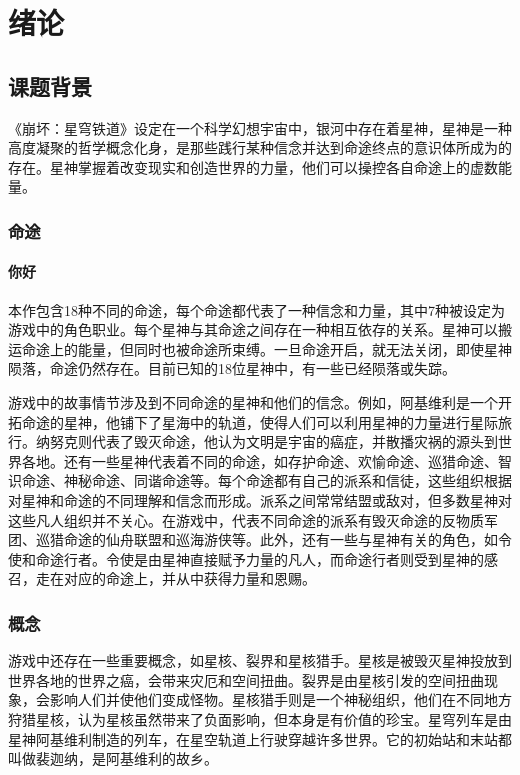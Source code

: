 \chapter{绪论}
\vspace{7pt}


\section{课题背景}

《崩坏：星穹铁道》设定在一个科学幻想宇宙中\cite{exampleid1}，银河中存在着星神，星神是一种高度凝聚的哲学概念化身，是那些践行某种信念并达到命途终点的意识体所成为的存在。星神掌握着改变现实和创造世界的力量，他们可以操控各自命途上的虚数能量。

\subsection{命途}
\subsubsection{你好}

本作包含18种不同的命途，每个命途都代表了一种信念和力量，其中7种被设定为游戏中的角色职业。每个星神与其命途之间存在一种相互依存的关系。星神可以搬运命途上的能量，但同时也被命途所束缚。一旦命途开启，就无法关闭，即使星神陨落，命途仍然存在。目前已知的18位星神中，有一些已经陨落或失踪。

游戏中的故事情节涉及到不同命途的星神和他们的信念。例如，阿基维利是一个开拓命途的星神，他铺下了星海中的轨道，使得人们可以利用星神的力量进行星际旅行。纳努克则代表了毁灭命途，他认为文明是宇宙的癌症，并散播灾祸的源头到世界各地。还有一些星神代表着不同的命途，如存护命途、欢愉命途、巡猎命途、智识命途、神秘命途、同谐命途等。每个命途都有自己的派系和信徒，这些组织根据对星神和命途的不同理解和信念而形成。派系之间常常结盟或敌对，但多数星神对这些凡人组织并不关心。在游戏中，代表不同命途的派系有毁灭命途的反物质军团、巡猎命途的仙舟联盟和巡海游侠等。此外，还有一些与星神有关的角色，如令使和命途行者。令使是由星神直接赋予力量的凡人，而命途行者则受到星神的感召，走在对应的命途上，并从中获得力量和恩赐。

\subsection{概念}

游戏中还存在一些重要概念，如星核、裂界和星核猎手。星核是被毁灭星神投放到世界各地的世界之癌，会带来灾厄和空间扭曲。裂界是由星核引发的空间扭曲现象，会影响人们并使他们变成怪物。星核猎手则是一个神秘组织，他们在不同地方狩猎星核，认为星核虽然带来了负面影响，但本身是有价值的珍宝。星穹列车是由星神阿基维利制造的列车，在星空轨道上行驶穿越许多世界。它的初始站和末站都叫做裴迦纳，是阿基维利的故乡。

